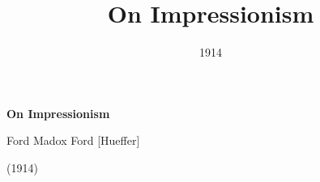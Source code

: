 \title{On Impressionism}
\author{}
\date{1914}


\renewcommand{\chaptername}{Ford {[}Hueffer{]}, On Impressionism}

\thispagestyle{plain}


\begin{raggedright}
{\Large \linespread{1.0} \noindent \textbf{On Impressionism} \par} 

{\large Ford Madox Ford {[}Hueffer{]} \par} 

\vspace{0.5em}
\end{raggedright}

\begin{raggedleft}
{\large \linespread{1.2} (1914) \par}
\end{raggedleft}
\vspace{1em}








